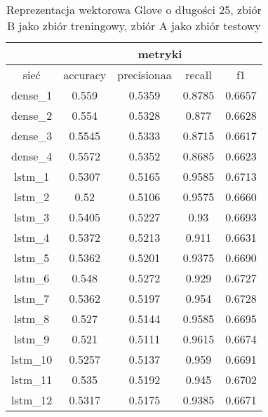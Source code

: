 \begin{table}[h] \centering
    \caption{Reprezentacja wektorowa Glove o długości 25, zbiór B jako zbiór treningowy, zbiór A jako zbiór testowy }
    \label{tab:wyniki_25_eks2}
    \begin{tabular}{|c|c|c|c|c|}
        \hline
                 & \multicolumn{4}{c|}{metryki}                                 \\ \hline
        sieć     & accuracy                     & precisionaa & recall & f1     \\ \hline
        dense\_1 & 0.559                        & 0.5359      & 0.8785 & 0.6657 \\ \hline
        dense\_2 & 0.554                        & 0.5328      & 0.877  & 0.6628 \\ \hline
        dense\_3 & 0.5545                       & 0.5333      & 0.8715 & 0.6617 \\ \hline
        dense\_4 & 0.5572                       & 0.5352      & 0.8685 & 0.6623 \\ \hline
        lstm\_1  & 0.5307                       & 0.5165      & 0.9585 & 0.6713 \\ \hline
        lstm\_2  & 0.52                         & 0.5106      & 0.9575 & 0.6660 \\ \hline
        lstm\_3  & 0.5405                       & 0.5227      & 0.93   & 0.6693 \\ \hline
        lstm\_4  & 0.5372                       & 0.5213      & 0.911  & 0.6631 \\ \hline
        lstm\_5  & 0.5362                       & 0.5201      & 0.9375 & 0.6690 \\ \hline
        lstm\_6  & 0.548                        & 0.5272      & 0.929  & 0.6727 \\ \hline
        lstm\_7  & 0.5362                       & 0.5197      & 0.954  & 0.6728 \\ \hline
        lstm\_8  & 0.527                        & 0.5144      & 0.9585 & 0.6695 \\ \hline
        lstm\_9  & 0.521                        & 0.5111      & 0.9615 & 0.6674 \\ \hline
        lstm\_10 & 0.5257                       & 0.5137      & 0.959  & 0.6691 \\ \hline
        lstm\_11 & 0.535                        & 0.5192      & 0.945  & 0.6702 \\ \hline
        lstm\_12 & 0.5317                       & 0.5175      & 0.9385 & 0.6671 \\ \hline

\end{tabular}
\end{table}
